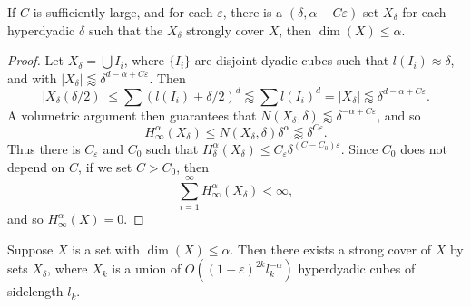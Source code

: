 \begin{lemma}
	If $C$ is sufficiently large, and for each $\varepsilon$, there is a $(\delta, \alpha - C \varepsilon)$ set $X_\delta$ for each hyperdyadic $\delta$ such that the $X_\delta$ strongly cover $X$, then $\dim(X) \leq \alpha$.
\end{lemma}
\begin{proof}
	Let $X_\delta = \bigcup I_i$, where $\{ I_i \}$ are disjoint dyadic cubes such that $l(I_i) \approx \delta$, and with $|X_\delta| \lessapprox \delta^{d-\alpha + C\varepsilon}$. Then
	\[ |X_\delta(\delta/2)| \leq \sum (l(I_i) + \delta/2)^d \lessapprox \sum l(I_i)^d = |X_\delta| \lessapprox \delta^{d - \alpha + C\varepsilon}. \]
	A volumetric argument then guarantees that $N(X_\delta,\delta) \lessapprox \delta^{-\alpha + C\varepsilon}$, and so
	\[ H^\alpha_\infty(X_\delta) \leq N(X_\delta,\delta) \delta^\alpha \lessapprox \delta^{C\varepsilon}. \]
	Thus there is $C_\varepsilon$ and $C_0$ such that $H^\alpha_\delta(X_\delta) \leq C_\varepsilon \delta^{(C - C_0) \varepsilon}$. Since $C_0$ does not depend on $C$, if we set $C > C_0$, then
	\[ \sum_{i = 1}^\infty H^\alpha_\infty(X_\delta) < \infty, \]
	and so $H^\alpha_\infty(X) = 0$.
\end{proof}

\begin{theorem}
	Suppose $X$ is a set with $\dim(X) \leq \alpha$. Then there exists a strong cover of $X$ by sets $X_\delta$, where $X_k$ is a union of $O((1 + \varepsilon)^{2k} l_k^{-\alpha})$ hyperdyadic cubes of sidelength $l_k$.
\end{theorem}

